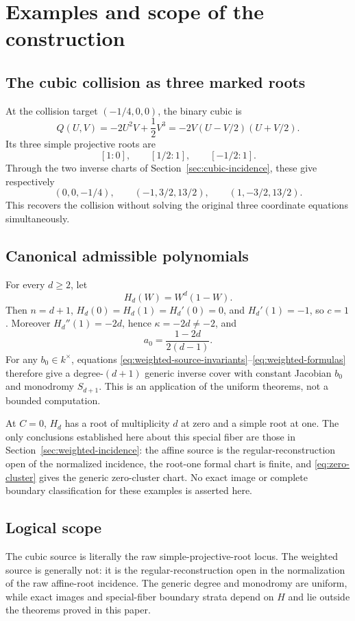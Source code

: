 \section{Examples and scope of the construction}\label{sec:examples}

\subsection{The cubic collision as three marked roots}

At the collision target $(-1/4,0,0)$, the binary cubic is
\[
 Q(U,V)=-2U^2V+\frac12V^3
       =-2V(U-V/2)(U+V/2).
\]
Its three simple projective roots are
\[
 [1:0],\qquad[1/2:1],\qquad[-1/2:1].
\]
Through the two inverse charts of Section~\ref{sec:cubic-incidence}, these
give respectively
\[
 (0,0,-1/4),\qquad(-1,3/2,13/2),\qquad(1,-3/2,13/2).
\]
This recovers the collision without solving the original three coordinate
equations simultaneously.

\subsection{Canonical admissible polynomials}

For every $d\ge2$, let
\[
 H_d(W)=W^d(1-W).
\]
Then $n=d+1$, $H_d(0)=H_d(1)=H_d'(0)=0$, and $H_d'(1)=-1$, so $c=1$.
Moreover $H_d''(1)=-2d$, hence $\kappa=-2d\ne-2$, and
\[
 a_0=\frac{1-2d}{2(d-1)}.
\]
For any $b_0\in k^\times$, equations
\eqref{eq:weighted-source-invariants}--\eqref{eq:weighted-formulas} therefore
give a degree-$(d+1)$ generic inverse cover with constant Jacobian $b_0$ and
monodromy $S_{d+1}$.  This is an application of the uniform theorems, not a
bounded computation.

At $C=0$, $H_d$ has a root of multiplicity $d$ at zero and a simple root at
one.  The only conclusions established here about this special fiber are those in
Section~\ref{sec:weighted-incidence}: the affine source is the
regular-reconstruction open of the normalized incidence, the root-one formal
chart is finite, and \eqref{eq:zero-cluster} gives the generic zero-cluster
chart.  No exact image or complete boundary classification for these examples
is asserted here.

\subsection{Logical scope}

The cubic source is literally the raw simple-projective-root locus.  The
weighted source is generally not: it is the regular-reconstruction open in
the normalization of the raw affine-root incidence.  The generic degree and
monodromy are uniform, while exact images and special-fiber boundary strata
depend on $H$ and lie outside the theorems proved in this paper.


